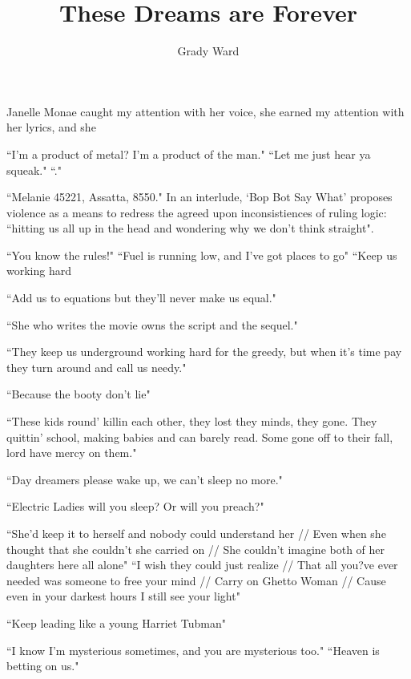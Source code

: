 \documentclass[11pt]{amsart}
\title{These Dreams are Forever}
\author{Grady Ward}
\date{}
\begin{document}
\nocite{*}
\maketitle

Janelle Monae caught my attention with her voice, she earned my attention with her lyrics, and she 


``I'm a product of metal? I'm a product of the man."\cite{happyhunting}
``Let me just hear ya squeak."\cite{happyhunting}
``."\cite{happyhunting}

``Melanie 45221, Assatta, 8550."\cite{chromeshoppe}
In an interlude, `Bop Bot Say What' proposes violence as a means to redress the agreed upon inconsistiences of ruling logic: ``hitting us all up in the head and wondering why we don't think straight"\cite{chromeshoppe}.

``You know the rules!"\cite{happyhunting}
``Fuel is running low, and I've got places to go"\cite{mrpresident}
``Keep us working hard 

``Add us to equations but they'll never make us equal."\cite{queen}

``She who writes the movie owns the script and the sequel."\cite{queen}

``They keep us underground working hard for the greedy, but when it's time pay they turn around and call us needy."\cite{queen}

``Because the booty don't lie"\cite{queen}

``These kids round' killin each other, they lost they minds, they gone. They quittin' school, making babies and can barely read. Some gone off to their fall, lord have mercy on them."\cite{sincerelyjane}

``Day dreamers please wake up, we can't sleep no more."\cite{sincerelyjane}

``Electric Ladies will you sleep? Or will you preach?"\cite{queen}

``She'd keep it to herself and nobody could understand her // Even when she thought that she couldn't she carried on // She couldn't imagine both of her daughters here all alone"\cite{ghettowoman}
``I wish they could just realize // That all you?ve ever needed was someone to free your mind // Carry on Ghetto Woman // Cause even in your darkest hours I still see your light" \cite{ghettowoman}

``Keep leading like a young Harriet Tubman"\cite{queen}

``I know I'm mysterious sometimes, and you are mysterious too."\cite{primetime}
``Heaven is betting on us."\cite{primetime}
\end{document}
